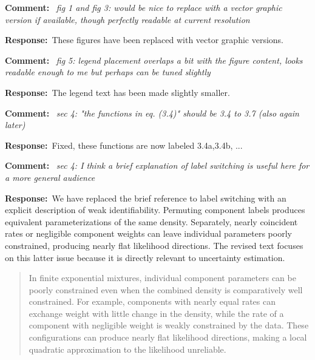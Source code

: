 \documentclass[11pt,a4paper]{article}
\newcommand{\refcomment}[1]{%
    \medskip\noindent\textbf{\color{refcolor}Comment:}\ %
    {\itshape #1}\par\smallskip
}
\newcommand{\response}{\noindent\textbf{Response:}\ }
\newcommand{\addedtext}[1]{%
    \smallskip\begin{quote}\color{quotecolor}\small #1\end{quote}\smallskip
}
\begin{document}
\refcomment{fig 1 and fig 3: would be nice to replace with a vector graphic version
if available, though perfectly readable at current resolution}
\response These figures have been replaced with vector graphic versions.

\refcomment{fig 5: legend placement overlaps a bit with the figure content, looks
readable enough to me but perhaps can be tuned slightly}
\response The legend text has been made slightly smaller.

\refcomment{sec 4: "the functions in eq. (3.4)" should be 3.4 to 3.7 (also again later)}
\response Fixed, these functions are now labeled 3.4a,3.4b, ...

\refcomment{sec 4: I think a brief explanation of label switching is useful here for a
more general audience}
\response We have replaced the brief reference to label switching with an explicit description of weak identifiability. Permuting component labels produces equivalent parameterizations of the same density. Separately, nearly coincident rates or negligible component weights can leave individual parameters poorly constrained, producing nearly flat likelihood directions. The revised text focuses on this latter issue because it is directly relevant to uncertainty estimation.

\addedtext{In finite exponential mixtures, individual component parameters can be poorly constrained even when the combined density is comparatively well constrained. For example, components with nearly equal rates can exchange weight with little change in the density, while the rate of a component with negligible weight is weakly constrained by the data. These configurations can produce nearly flat likelihood directions, making a local quadratic approximation to the likelihood unreliable.}
\end{document}
